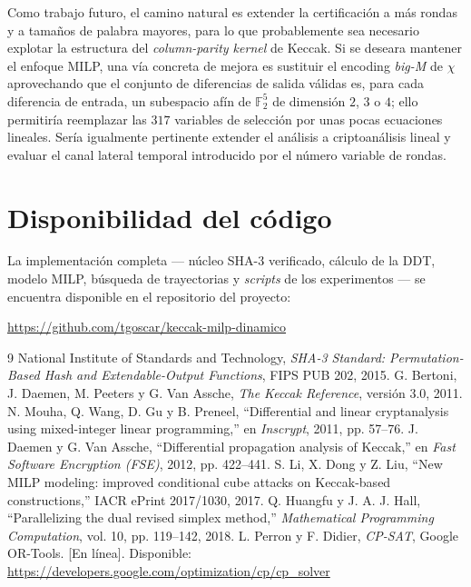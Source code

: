 \documentclass[conference]{IEEEtran}
\newcommand{\Fdos}{\mathbb{F}_2}
\begin{document}
Como trabajo futuro, el camino natural es extender la certificación a más rondas y a
tamaños de palabra mayores, para lo que probablemente sea necesario explotar la estructura
del \emph{column-parity kernel} de Keccak. Si se deseara mantener el enfoque MILP, una vía
concreta de mejora es sustituir el encoding \emph{big-M} de $\chi$ aprovechando que el
conjunto de diferencias de salida válidas es, para cada diferencia de entrada, un subespacio
afín de $\Fdos^5$ de dimensión $2$, $3$ o $4$; ello permitiría reemplazar las $317$
variables de selección por unas pocas ecuaciones lineales. Sería igualmente pertinente
extender el análisis a criptoanálisis lineal y evaluar el canal lateral temporal introducido
por el número variable de rondas.

\section*{Disponibilidad del código}

La implementación completa --- núcleo SHA-3 verificado, cálculo de la DDT, modelo MILP,
búsqueda de trayectorias y \emph{scripts} de los experimentos --- se encuentra disponible
en el repositorio del proyecto:
\begin{center}
\url{https://github.com/tgoscar/keccak-milp-dinamico}
\end{center}

\begin{thebibliography}{9}
 National Institute of Standards and Technology, \emph{SHA-3 Standard:
Permutation-Based Hash and Extendable-Output Functions}, FIPS PUB 202, 2015.
 G. Bertoni, J. Daemen, M. Peeters y G. Van Assche, \emph{The Keccak
Reference}, versión 3.0, 2011.
 N. Mouha, Q. Wang, D. Gu y B. Preneel, ``Differential and linear
cryptanalysis using mixed-integer linear programming,'' en \emph{Inscrypt}, 2011,
pp. 57--76.
 J. Daemen y G. Van Assche, ``Differential propagation analysis of
Keccak,'' en \emph{Fast Software Encryption (FSE)}, 2012, pp. 422--441.
 S. Li, X. Dong y Z. Liu, ``New MILP modeling: improved conditional
cube attacks on Keccak-based constructions,'' IACR ePrint 2017/1030, 2017.
 Q. Huangfu y J. A. J. Hall, ``Parallelizing the dual revised simplex
method,'' \emph{Mathematical Programming Computation}, vol. 10, pp. 119--142, 2018.
 L. Perron y F. Didier, \emph{CP-SAT}, Google OR-Tools. [En línea].
Disponible: \url{https://developers.google.com/optimization/cp/cp_solver}
\end{thebibliography}
\end{document}
